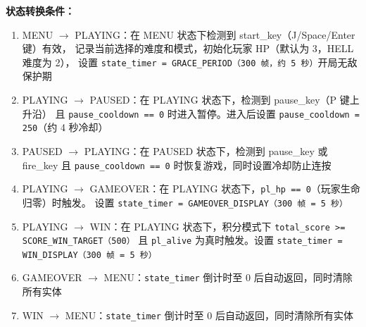 \documentclass[12pt,a4paper]{ctexart}
\begin{document}
\textbf{状态转换条件：}

\begin{enumerate}[label=(\arabic*)]
    \item MENU $\rightarrow$ PLAYING：在 MENU 状态下检测到 start\_key（J/Space/Enter 键）有效，
    记录当前选择的难度和模式，初始化玩家 HP（默认为 3，HELL 难度为 2），
    设置 \texttt{state\_timer = GRACE\_PERIOD（300 帧，约 5 秒）}开局无敌保护期
    \item PLAYING $\rightarrow$ PAUSED：在 PLAYING 状态下，检测到 pause\_key（P 键上升沿）
    且 \texttt{pause\_cooldown == 0} 时进入暂停。进入后设置 \texttt{pause\_cooldown = 250}（约 4 秒冷却）
    \item PAUSED $\rightarrow$ PLAYING：在 PAUSED 状态下，检测到 pause\_key 或 fire\_key 且
    \texttt{pause\_cooldown == 0} 时恢复游戏，同时设置冷却防止连按
    \item PLAYING $\rightarrow$ GAMEOVER：在 PLAYING 状态下，\texttt{pl\_hp == 0}（玩家生命归零）时触发。
    设置 \texttt{state\_timer = GAMEOVER\_DISPLAY（300 帧 = 5 秒）}
    \item PLAYING $\rightarrow$ WIN：在 PLAYING 状态下，积分模式下 \texttt{total\_score >= SCORE\_WIN\_TARGET（500）}
    且 \texttt{pl\_alive} 为真时触发。设置 \texttt{state\_timer = WIN\_DISPLAY（300 帧 = 5 秒）}
    \item GAMEOVER $\rightarrow$ MENU：\texttt{state\_timer} 倒计时至 0 后自动返回，同时清除所有实体
    \item WIN $\rightarrow$ MENU：\texttt{state\_timer} 倒计时至 0 后自动返回，同时清除所有实体
\end{enumerate}
\end{document}
